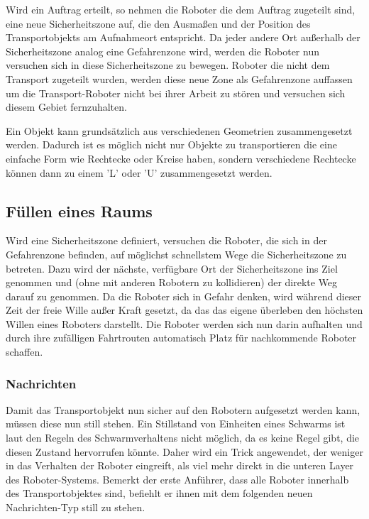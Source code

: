 Wird ein Auftrag erteilt, so nehmen die Roboter die dem Auftrag zugeteilt sind, eine neue Sicherheitszone auf, die den Ausmaßen und der Position des Transportobjekts am Aufnahmeort entspricht. Da jeder andere Ort außerhalb der Sicherheitszone analog eine Gefahrenzone wird, werden die Roboter nun versuchen sich in diese Sicherheitszone zu bewegen. Roboter die nicht dem Transport zugeteilt wurden, werden diese neue Zone als Gefahrenzone auffassen um die Transport-Roboter nicht bei ihrer Arbeit zu stören und versuchen sich diesem Gebiet fernzuhalten.

Ein Objekt kann grundsätzlich aus verschiedenen Geometrien zusammengesetzt werden. Dadurch ist es möglich nicht nur Objekte zu transportieren die eine einfache Form wie Rechtecke oder Kreise haben, sondern verschiedene Rechtecke können dann zu einem 'L' oder 'U' zusammengesetzt werden.

\subsection*{Füllen eines Raums}

Wird eine Sicherheitszone definiert, versuchen die Roboter, die sich in der Gefahrenzone befinden, auf möglichst schnellstem Wege die Sicherheitszone zu betreten. Dazu wird der nächste, verfügbare Ort der Sicherheitszone ins Ziel genommen und (ohne mit anderen Robotern zu kollidieren) der direkte Weg darauf zu genommen. Da die Roboter sich in Gefahr denken, wird während dieser Zeit der freie Wille außer Kraft gesetzt, da das das eigene überleben den höchsten Willen eines Roboters darstellt. Die Roboter werden sich nun darin aufhalten und durch ihre zufälligen Fahrtrouten automatisch Platz für nachkommende Roboter schaffen.

\subsubsection*{Nachrichten}

Damit das Transportobjekt nun sicher auf den Robotern aufgesetzt werden kann, müssen diese nun still stehen. Ein Stillstand von Einheiten eines Schwarms ist laut den Regeln des Schwarmverhaltens nicht möglich, da es keine Regel gibt, die diesen Zustand hervorrufen könnte. Daher wird ein Trick angewendet, der weniger in das Verhalten der Roboter eingreift, als viel mehr direkt in die unteren Layer des Roboter-Systems. Bemerkt der erste Anführer, dass alle Roboter innerhalb des Transportobjektes sind, befiehlt er ihnen mit dem folgenden neuen Nachrichten-Typ still zu stehen.

